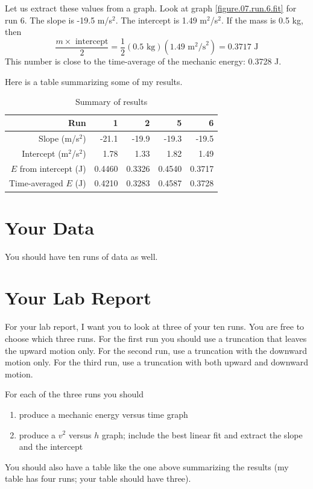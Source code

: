 Let us extract these values from a graph. Look at graph \ref{figure.07.run.6.fit} for run 6. The slope is -19.5 m/s$^{2}$. The intercept is 1.49 m$^{2}$/s$^{2}$. If the mass is 0.5 kg, then
\begin{equation}
    \frac{m \times \text{ intercept}}{2} = \frac{1}{2} (0.5 \text{ kg}) (1.49 \text{ m}^{2}\text{/s}^{2}) = 0.3717 \text{ J}
\end{equation}
This number is close to the time-average of the mechanic energy: 0.3728 J.

Here is a table summarizing some of my results.
\begin{table}
	\centering
    \begin{tabular}{|r|r|r|r|r|}\hline
        Run & 1 & 2 & 5 & 6 \\ \hline
        Slope (m/s$^{2}$) & -21.1 & -19.9 & -19.3 & -19.5 \\
        Intercept (m$^{2}$/s$^{2}$) & 1.78 & 1.33 & 1.82 & 1.49 \\
        $E$ from intercept (J) & 0.4460 & 0.3326 & 0.4540 & 0.3717 \\
        Time-averaged $E$ (J) & 0.4210 & 0.3283 & 0.4587 & 0.3728 \\
        \hline
    \end{tabular}
    \caption{Summary of results}
    \label{table.07.results}
\end{table}
\section{Your Data}
You should have ten runs of data as well.
\section{Your Lab Report}
For your lab report, I want you to look at three of your ten runs. You are free to choose which three runs. For the first run you should use a truncation that leaves the upward motion only. For the second run, use a truncation with the downward motion only. For the third run, use a truncation with both upward and downward motion.

For each of the three runs you should
\begin{enumerate}
    \item produce a mechanic energy versus time graph
    \item produce a $v^{2}$ versus $h$ graph; include the best linear fit and extract the slope and the intercept
\end{enumerate}
You should also have a table like the one above summarizing the results (my table has four runs; your table should have three).